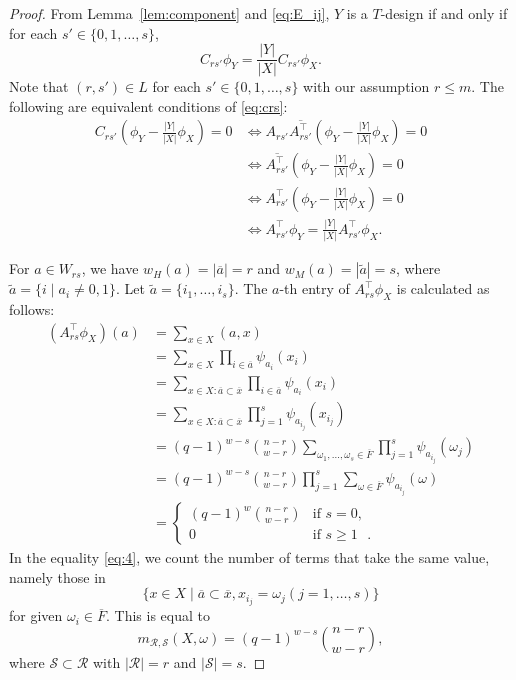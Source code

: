 \documentclass[10pt,a4paper]{amsart}
\begin{document}
\begin{proof}
From Lemma~\ref{lem:component} and \eqref{eq:E_ij}, 
$Y$ is a $T$-design if and only if for each $s' \in \{0,1,\ldots,s\}$, 
\begin{equation} \label{eq:crs}
C_{rs'}\phi_Y=\frac{|Y|}{|X|} C_{rs'} \phi_X.     
\end{equation} 
Note that $(r,s') \in L$ for each $s' \in \{0,1,\ldots, s\}$ with our assumption $r\leq m$. 
    The following are equivalent conditions of \eqref{eq:crs}: 
    \begin{align*}
C_{rs'}(\phi_Y-\frac{|Y|}{|X|} \phi_X)=0 
&\Leftrightarrow A_{rs'}\overline{A_{rs'}^\top}(\phi_Y-\frac{|Y|}{|X|} \phi_X) =0\\
& \Leftrightarrow \overline{A_{rs'}^\top}(\phi_Y-\frac{|Y|}{|X|} \phi_X)=0\\
& \Leftrightarrow A_{rs'}^\top(\phi_Y-\frac{|Y|}{|X|} \phi_X)=0
\\
& \Leftrightarrow A_{rs'}^\top\phi_Y=\frac{|Y|}{|X|}A_{rs'}^\top \phi_X. 
    \end{align*}
 
    For $a \in W_{rs}$, we have $w_H(a)=|\overline{a}|=r$ and $w_M(a)=|\tilde{a}|=s$, where $\tilde{a}=\{i \mid a_i\ne 0,1\}$. 
    Let $\tilde{a}=\{i_1,\ldots, i_s\}$. 
    The $a$-th entry of $A_{rs}^\top \phi_X$ is calculated as follows: 
    \begin{align}
    (A_{rs}^\top \phi_X)(a)&=\sum_{x \in X} (a,x) \nonumber \\
    &=\sum_{x \in X} \prod_{i \in \overline{a}} 
    \psi_{a_i}(x_i)  \nonumber \\
    &= \sum_{x \in X: \overline{a} \subset \overline{x} } \prod_{i \in \overline{a}} \psi_{a_i}(x_i) \label{eq:5} \\
    &= \sum_{x \in X: \overline{a} \subset \overline{x} } \prod_{j =1}^s \psi_{a_{i_j}}(x_{i_j})  \nonumber \\
    &=(q-1)^{w-s} \binom{n-r}{w-r}\sum_{\omega_1,\ldots,\omega_s \in \overline{F}} \prod_{j =1}^s \psi_{a_{i_j}}(\omega_j) \label{eq:4} \\
    &= (q-1)^{w-s} \binom{n-r}{w-r} \prod_{j=1}^s \sum_{\omega \in \overline{F}}\psi_{a_{i_j}}(\omega)  \nonumber \\
    &=\begin{cases}
        (q-1)^{w} \binom{n-r}{w-r} &\text{if $s=0$},  \nonumber\\
        0 &\text{if $s\geq 1$ }. 
    \end{cases}
    \end{align} 
In the equality \eqref{eq:4}, we count the number of terms that take the same value, namely those in  
\[
\{ x \in X \mid \overline{a} \subset \overline{x}, x_{i_j} = \omega_j( j =1,\ldots,s) \}
\]
for given $\omega_i \in \overline{F}$. 
This is equal to 
\[
m_{\mathcal{R},\mathcal{S}}(X,\omega)=(q-1)^{w-s} \binom{n-r}{w-r}, 
\]
where $\mathcal{S} \subset \mathcal{R}$ with $|\mathcal{R}|=r$ and $|\mathcal{S}|=s$. 


\end{proof}
\end{document}
